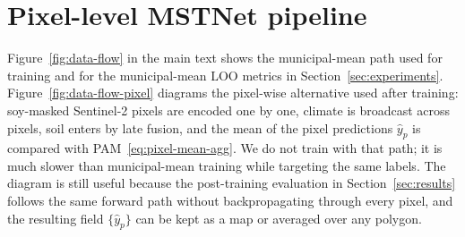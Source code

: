\appendix
\section{Pixel-level MSTNet pipeline}
\label{app:pixel-pipeline}

Figure~\ref{fig:data-flow} in the main text shows the municipal-mean path used for training and for the municipal-mean LOO metrics in Section~\ref{sec:experiments}.
Figure~\ref{fig:data-flow-pixel} diagrams the pixel-wise alternative used after training: soy-masked Sentinel-2 pixels are encoded one by one, climate is broadcast across pixels, soil enters by late fusion, and the mean of the pixel predictions $\hat{y}_p$ is compared with PAM~\eqref{eq:pixel-mean-agg}.
We do not train with that path; it is much slower than municipal-mean training while targeting the same labels.
The diagram is still useful because the post-training evaluation in Section~\ref{sec:results} follows the same forward path without backpropagating through every pixel, and the resulting field $\{\hat{y}_p\}$ can be kept as a map or averaged over any polygon.

